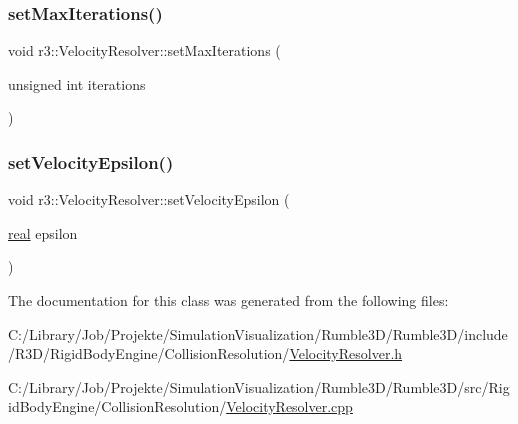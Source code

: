 \subsubsection{\texorpdfstring{set\+Max\+Iterations()}{setMaxIterations()}}
{\footnotesize\ttfamily void r3\+::\+Velocity\+Resolver\+::set\+Max\+Iterations (\begin{DoxyParamCaption}\item[{unsigned int}]{iterations }\end{DoxyParamCaption})}

\mbox{\label{classr3_1_1_velocity_resolver_a91b4f4f3c064f11983ae9dbe40232c86}} 
\subsubsection{\texorpdfstring{set\+Velocity\+Epsilon()}{setVelocityEpsilon()}}
{\footnotesize\ttfamily void r3\+::\+Velocity\+Resolver\+::set\+Velocity\+Epsilon (\begin{DoxyParamCaption}\item[{\mbox{\hyperlink{namespacer3_ab2016b3e3f743fb735afce242f0dc1eb}{real}}}]{epsilon }\end{DoxyParamCaption})}



The documentation for this class was generated from the following files\+:\begin{DoxyCompactItemize}
\item 
C\+:/\+Library/\+Job/\+Projekte/\+Simulation\+Visualization/\+Rumble3\+D/\+Rumble3\+D/include/\+R3\+D/\+Rigid\+Body\+Engine/\+Collision\+Resolution/\mbox{\hyperlink{_velocity_resolver_8h}{Velocity\+Resolver.\+h}}\item 
C\+:/\+Library/\+Job/\+Projekte/\+Simulation\+Visualization/\+Rumble3\+D/\+Rumble3\+D/src/\+Rigid\+Body\+Engine/\+Collision\+Resolution/\mbox{\hyperlink{_velocity_resolver_8cpp}{Velocity\+Resolver.\+cpp}}\end{DoxyCompactItemize}
